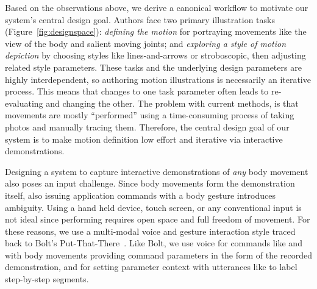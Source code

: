 Based on the observations above, we derive a canonical workflow to motivate our system's central design goal.
Authors face two primary illustration tasks (Figure~\ref{fig:designspace}):
\textit{defining the motion} for portraying movements like the view of the body and salient moving joints;
and \textit{exploring a style of motion depiction} by choosing styles like lines-and-arrows or stroboscopic, then adjusting related style parameters.
These tasks and the underlying design parameters are highly interdependent, so authoring motion illustrations is necessarily an iterative process.
This means that changes to one task parameter often leads to re-evaluating and changing the other.
The problem with current methods, is that movements are mostly ``performed'' using a time-consuming process of taking photos and manually tracing them.
%
Therefore, the central design goal of our system is to make motion definition low effort and iterative via interactive demonstrations.





Designing a system to capture interactive demonstrations of \textit{any} body movement also poses an input challenge.
Since  body movements form the demonstration itself, also issuing application commands with a body gesture introduces ambiguity.
Using a hand held device, touch screen, or any conventional input is not ideal since performing requires open space and full freedom of movement.
For these reasons, we use a multi-modal voice and gesture interaction style traced back to Bolt's Put-That-There~\cite{Bolt:1980:PutThatThere}. Like Bolt, we use voice for commands like  and  with body movements providing command parameters in the form of the recorded demonstration, and for setting parameter context with utterances like  to label step-by-step segments.

